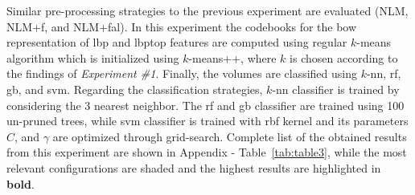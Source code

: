 Similar pre-processing strategies to the previous experiment are evaluated (NLM, NLM+\acs{f}, and NLM+\acs{fal}).
In this experiment the codebooks for the \ac{bow} representation of \ac{lbp} and \ac{lbptop} features are computed using regular $k$-means algorithm which is initialized using $k$-means++, where $k$ is chosen according to the findings of \emph{Experiment \#1}.
Finally, the volumes are classified using $k$-\ac{nn}, \ac{rf}, \ac{gb}, and \ac{svm}.
Regarding the classification strategies, $k$-\ac{nn} classifier is trained by considering the 3 nearest neighbor.
The \ac{rf} and \ac{gb} classifier are trained using 100 un-pruned trees, while \ac{svm} classifier is trained with \ac{rbf} kernel and its parameters $C$, and $\gamma$ are optimized through grid-search.
Complete list of the obtained results from this experiment are shown in Appendix - Table~\ref{tab:table3}, while the most relevant configurations are shaded and the highest results are highlighted in \textbf{bold}.

%

